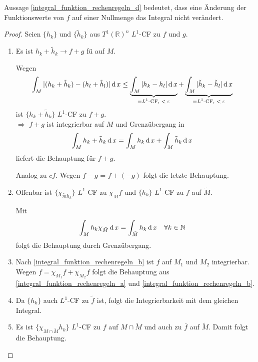 Aussage \ref{integral_funktion_rechenregeln_d} bedeutet, dass eine Änderung der Funktionswerte von $f$ auf einer Nullmenge das Integral nicht verändert.

\begin{proof}
	Seien $\{ h_k\}$ und $\{ \tilde{h}_k \}$ aus $T^1(\mathbb{R})^n$ $L^1$-CF zu $f$ und $g$.
	
	\begin{enumerate}[label={zu \alph*)},leftmargin=\widthof{\texttt{zu a) }},topsep=\dimexpr-\baselineskip/2\relax]
		\item Es ist $h_k + \tilde{h}_k\to f + g$ \gls{fü} auf $M$.
		
		Wegen \begin{align*}
			\int_M \vert (h_k + \tilde{h}_k) - (h_l + \tilde{h}_l)\vert \operatorname{d} x &\le \underbrace{\int_M \vert h_k - h_l\vert \operatorname{d} x}_{=\text{$L^1$-CF, $<\varepsilon$}} + \underbrace{\int_M \vert \tilde{h}_k - \tilde{h}_l \vert \operatorname{d} x}_{=\text{$L^1$-CF, $<\varepsilon$}}
		\end{align*}
		ist $\{ h_k + \tilde{h}_k\}$ $L^1$-CF zu $f+g$. \\
		$\Rightarrow$ $f+g$ ist integrierbar auf $M$ und Grenzübergang in \begin{align*}
			\int_M h_k + \tilde{h}_k \operatorname{d} x &= \int_M h_k \operatorname{d} x + \int_M \tilde{h}_k \operatorname{d} x
		\end{align*}
		liefert die Behauptung für $f+g$.
		
		Analog zu $cf$. Wegen $f - g$ = $f + (-g)$ folgt die letzte Behauptung.
		
		\item Offenbar ist $\{ \chi_{\tilde{m} h_k} \}$ $L^1$-CF zu $\chi_{\tilde{M}}f$ und $\{ h_k \}$ $L^1$-CF zu $f$ auf $\tilde{M}$.
		
		Mit \begin{align*}
			\int_M h_k \chi_{\tilde{M}} \operatorname{d} x &= \int_{\tilde{M}} h_k \operatorname{d} x\quad\forall k\in\mathbb{N}
		\end{align*}
		folgt die Behauptung durch Grenzübergang.
		\item Nach \ref{integral_funktion_rechenregeln_b} ist $f$ auf $M_1$ und $M_2$ integrierbar. Wegen $f = \chi_{M_1} f + \chi_{M_2} f$ folgt die Behauptung aus \ref{integral_funktion_rechenregeln_a} und \ref{integral_funktion_rechenregeln_b}.
		\item Da $\{ h_k\}$ auch $L^1$-CF zu $\tilde{f}$ ist, folgt die Integrierbarkeit mit dem gleichen Integral.
		\item Es ist $\{ \chi_{M\cap \tilde{M}} h_k \}$ $L^1$-CF zu $f$ auf $M\cap \tilde{M}$ und auch zu $\overline{f}$ auf $\tilde{M}$. Damit folgt die Behauptung.
	\end{enumerate}
\end{proof}

